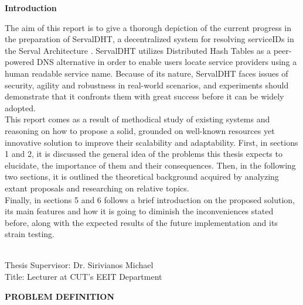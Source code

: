 \documentclass[12pt,a4paper,oneside]{article}
\begin{document}
{\Large \bf \noindent Introduction} \\[0.5cm]
The aim of this report is to give a thorough depiction of the current progress in the preparation of ServalDHT, a decentralized system for resolving serviceIDs in the Serval Architecture \cite{Nordstrom2012}.
ServalDHT utilizes Distributed Hash Tables  as a peer-powered DNS   alternative in order to enable users locate service providers using a human readable service name.
Because of its nature, ServalDHT faces issues of security, agility and robustness in real-world scenarios, and experiments should demonstrate that it confronts them with great success before it can be widely adopted.\\
\indent This report comes as a result of methodical study of existing systems and reasoning on how to propose a solid, grounded on well-known resources yet innovative solution to improve their scalability and adaptability.
First, in sections 1 and 2, it is discussed the general idea of the problems this thesis expects to elucidate, the importance of them and their consequences.
Then, in the following two sections, it is outlined the theoretical background acquired by analyzing extant proposals and researching on relative topics.\\
\indent Finally, in sections 5 and 6 follows a brief introduction on the proposed solution, its main features and how it is going to diminish the inconveniences stated before, along with the expected results of the future implementation and its strain testing.

~\\[0.5cm]
{\large
\noindent Thesis Supervisor: Dr. Sirivianos Michael\\
\noindent Title: Lecturer at CUT's EEIT Department}

\newpage
\thispagestyle{empty}
{\Huge \bf \noindent PROBLEM DEFINITION}
\newpage


\newpage
\end{document}
